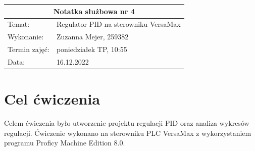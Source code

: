 \documentclass[12pt]{article}
\begin{document}
\newcommand{\zdjecie}[3]
{
    \begin{figure}[H]
        \renewcommand{\figurename}{Rys.}
        \centering
        \texttt{[image: \#1]}
        \caption{#2}
        \label{#3}
    \end{figure}
}

\begin{table}[H]
    \centering
    \renewcommand{\arraystretch}{1.5}
    \begin{tabularx}{\textwidth}{|X|X|}
    \hline
    \multicolumn{2}{|c|}{\large\textbf{Notatka służbowa nr 4}} \\ \hline
    Temat:          & Regulator PID na sterowniku VersaMax    \\ \hline
    Wykonanie:      & Zuzanna Mejer, 259382   \\ \hline
    Termin zajęć:   & poniedziałek TP, 10:55  \\ \hline  
    Data:           & 16.12.2022    \\ \hline
    \end{tabularx}
    \end{table}

\section{Cel ćwiczenia}
Celem ćwiczenia było utworzenie projektu regulacji PID oraz analiza wykresów regulacji. Ćwiczenie wykonano na sterowniku PLC VersaMax z wykorzystaniem programu Proficy Machine Edition 8.0. 
\end{document}
